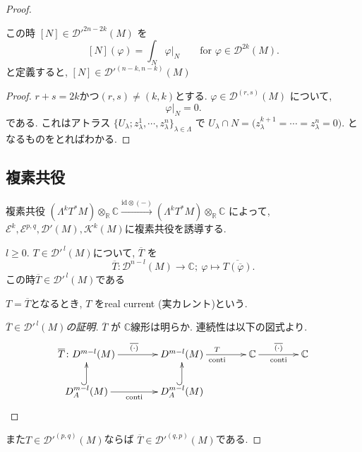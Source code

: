 \begin{proof}
\begin{ex}
この時 \([N] \in \mathcal{D}'^{2n-2k}(M)\) を
\[
[N](\varphi)=\int_N \varphi|_N
\qquad \text{for } \varphi \in \mathcal{D}^{2k}(M).
\]
と定義すると,  \([N] \in \mathcal{D}'^{(n-k,n-k)}(M)\)

\begin{proof}
\( r+s=2k \)かつ$(r,s)\neq (k,k)$とする. 
\( \varphi \in \mathcal{D}^{(r,s)}(M) \) について, 
\[
\varphi|_N = 0.
\]
である. 
これはアトラス \( \{U_\lambda; z_\lambda^1,\cdots,z_\lambda^n\}_{\lambda\in\Lambda} \)
で
\(
U_\lambda \cap N = \bigl( z_\lambda^{k+1}=\cdots=z_\lambda^n=0 \bigr).
\)
となるものをとればわかる. 
\end{proof}
\end{ex}

\subsection{複素共役}

複素共役
\( (\Lambda^k T^*M) \otimes_{\mathbb{R}} \mathbb{C}
\overset{\text{id}\otimes(-)}{\longrightarrow}
(\Lambda^k T^*M)\otimes_{\mathbb{R}} \mathbb{C} \)
によって, \( \mathcal{E}^k, \mathcal{E}^{p,q}, \mathcal{D}'(M), \mathcal{K}^k(M) \)に複素共役を誘導する. 

\begin{tcolorbox}[mybox]
\begin{defn}
\label{defn-M-4.2.1}
\( l\geq 0 \). \( T\in \mathcal{D}'^{\,l}(M) \)について, 
 \( \overline{T} \) を
\[
\overline{T}:\mathcal{D}^{n-l}(M)\to \mathbb{C};\ \varphi \mapsto \overline{T(\overline{\varphi})}.
\]
この時\( \overline{T}\in \mathcal{D}'^{\,l}(M) \)である

 \( T=\overline{T} \)となるとき, \( T \) をreal current (実カレント)という. 
\end{defn}
\end{tcolorbox}

\begin{proof}[\( \overline{T}\in \mathcal{D}'^{\,l}(M) \)の証明]
 \( \overline{T} \) が \( \mathbb{C} \)線形は明らか. 連続性は以下の図式より. 
\[
\xymatrix@C=4em@R=2em{
\overline{T}\colon
D^{m-l}(M)\ar[r]^{\overline{(\cdot)}}
&
D^{m-l}(M)\ar[r]^{T}_{\text{conti}}
&
\mathbb{C}\ar[r]^{\overline{(\cdot)}}_{\text{conti}}
&
\mathbb{C}
\\
D_A^{m-l}(M)\ar@{^{(}->}[u]\ar[r]_{\text{conti}}
&
D_A^{m-l}(M)\ar@{^{(}->}[u]
}
\]
\end{proof}


また\( T\in \mathcal{D}'^{(p,q)}(M) \)ならば \( \overline{T}\in \mathcal{D}'^{(q,p)}(M) \)である. 


\end{proof}
